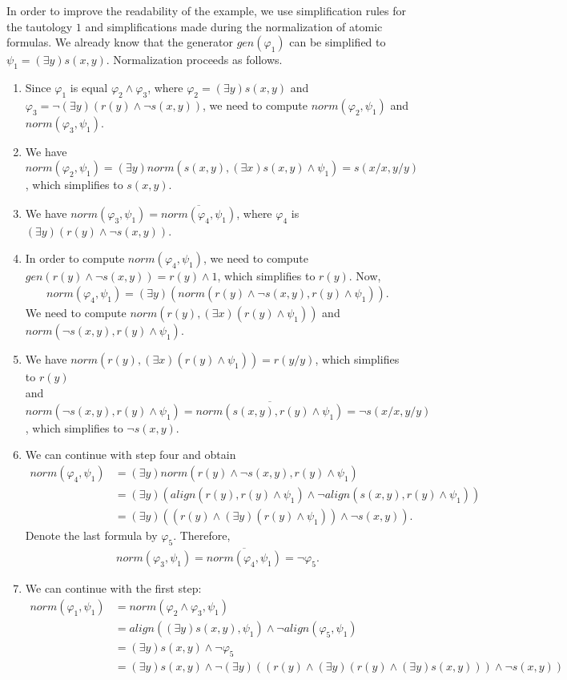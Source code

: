 \documentclass{lmcs}
\def\norm{norm}
\def\al{align}
\def\gen{gen}
\begin{document}
In order to improve the readability of the example, we use simplification rules for the tautology $1$ and simplifications made during the normalization of atomic formulas. We already know that the generator $\gen(\varphi_1)$ can be simplified to $\psi_1=(\exists y)s(x,y)$. Normalization proceeds as follows.
\begin{enumerate}
\item Since $\varphi_1$ is equal $\varphi_2\wedge\varphi_3$, where $\varphi_2=(\exists y)s(x,y)$ and $\varphi_3=\neg(\exists y)(r(y)\wedge\neg s(x,y))$, we need to compute $\norm(\varphi_2,\psi_1)$ and $\norm(\varphi_3,\psi_1)$. 
\item We have $\norm(\varphi_2,\psi_1)=(\exists y)\norm(s(x,y),(\exists x)s(x,y)\wedge\psi_1)=s(x/x,y/y)$, which simplifies to $s(x,y)$.
\item We have $\norm(\varphi_3,\psi_1)=\overline{\norm(\varphi_4,\psi_1)}$, where $\varphi_4$ is $(\exists y)(r(y)\wedge\neg s(x,y))$.
\item In order to compute $\norm(\varphi_4,\psi_1)$, we need to compute $\gen(r(y)\wedge\neg s(x,y))=r(y)\wedge1$, which simplifies to $r(y)$. Now,
\begin{align*}
\norm(\varphi_4,\psi_1)=(\exists y)(\norm(r(y)\wedge\neg s(x,y),r(y)\wedge\psi_1)).
\end{align*}
We need to compute $\norm(r(y),(\exists x)(r(y)\wedge\psi_1))$ and $\norm(\neg s(x,y),r(y)\wedge\psi_1)$.
\item We have $\norm(r(y),(\exists x)(r(y)\wedge\psi_1))=r(y/y)$, which simplifies to $r(y)$ \\and $\norm(\neg s(x,y),r(y)\wedge\psi_1)=\overline{\norm(s(x,y),r(y)\wedge\psi_1)}=\neg{s(x/x,y/y)}$, which simplifies to $\neg s(x,y)$.
\item We can continue with step four and obtain
\begin{align*}
\norm(\varphi_4,\psi_1)&=(\exists y)\norm(r(y)\wedge\neg s(x,y),r(y)\wedge\psi_1)\\
&=(\exists y)(\al(r(y),r(y)\wedge\psi_1)\wedge\neg\al(s(x,y),r(y)\wedge\psi_1))\\
&=(\exists y)((r(y)\wedge(\exists y)(r(y)\wedge\psi_1))\wedge\neg s(x,y)). 
\end{align*}
Denote the last formula by $\varphi_5$. Therefore,
\begin{align*}
\norm(\varphi_3,\psi_1)=\overline{\norm(\varphi_4,\psi_1)}=\neg\varphi_5.
\end{align*}
\item We can continue with the first step:
\begin{align*}
\norm(\varphi_1,\psi_1)&=\norm(\varphi_2\wedge\varphi_3,\psi_1)\\
&=\al((\exists y)s(x,y),\psi_1)\wedge\neg\al(\varphi_5,\psi_1)\\
&=(\exists y)s(x,y)\wedge\neg\varphi_5\\
&=(\exists y)s(x,y)\wedge\neg(\exists y)((r(y)\wedge(\exists y)(r(y)\wedge(\exists y)s(x,y)))\wedge\neg s(x,y))
\end{align*}
\end{enumerate}
\end{document}
